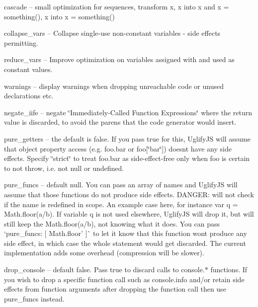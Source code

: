 \begin{DoxyItemize}
\item {\ttfamily cascade} -- small optimization for sequences, transform {\ttfamily x, x} into {\ttfamily x} and {\ttfamily x = something(), x} into {\ttfamily x = something()}
\item {\ttfamily collapse\+\_\+vars} -- Collapse single-\/use non-\/constant variables -\/ side effects permitting.
\item {\ttfamily reduce\+\_\+vars} -- Improve optimization on variables assigned with and used as constant values.
\item {\ttfamily warnings} -- display warnings when dropping unreachable code or unused declarations etc.
\item {\ttfamily negate\+\_\+iife} -- negate \char`\"{}\+Immediately-\/\+Called Function Expressions\char`\"{} where the return value is discarded, to avoid the parens that the code generator would insert.
\item {\ttfamily pure\+\_\+getters} -- the default is {\ttfamily false}. If you pass {\ttfamily true} for this, Uglify\+JS will assume that object property access (e.\+g. {\ttfamily foo.\+bar} or {\ttfamily foo\mbox{[}\char`\"{}bar\char`\"{}\mbox{]}}) doesn\textquotesingle{}t have any side effects. Specify {\ttfamily \char`\"{}strict\char`\"{}} to treat {\ttfamily foo.\+bar} as side-\/effect-\/free only when {\ttfamily foo} is certain to not throw, i.\+e. not {\ttfamily null} or {\ttfamily undefined}.
\item {\ttfamily pure\+\_\+funcs} -- default {\ttfamily null}. You can pass an array of names and Uglify\+JS will assume that those functions do not produce side effects. D\+A\+N\+G\+ER\+: will not check if the name is redefined in scope. An example case here, for instance {\ttfamily var q = Math.\+floor(a/b)}. If variable {\ttfamily q} is not used elsewhere, Uglify\+JS will drop it, but will still keep the {\ttfamily Math.\+floor(a/b)}, not knowing what it does. You can pass `pure\+\_\+funcs\+: \mbox{[} \textquotesingle{}Math.\+floor' \mbox{]}\`{} to let it know that this function won\textquotesingle{}t produce any side effect, in which case the whole statement would get discarded. The current implementation adds some overhead (compression will be slower).
\item {\ttfamily drop\+\_\+console} -- default {\ttfamily false}. Pass {\ttfamily true} to discard calls to {\ttfamily console.$\ast$} functions. If you wish to drop a specific function call such as {\ttfamily console.\+info} and/or retain side effects from function arguments after dropping the function call then use {\ttfamily pure\+\_\+funcs} instead.

\end{DoxyItemize}
